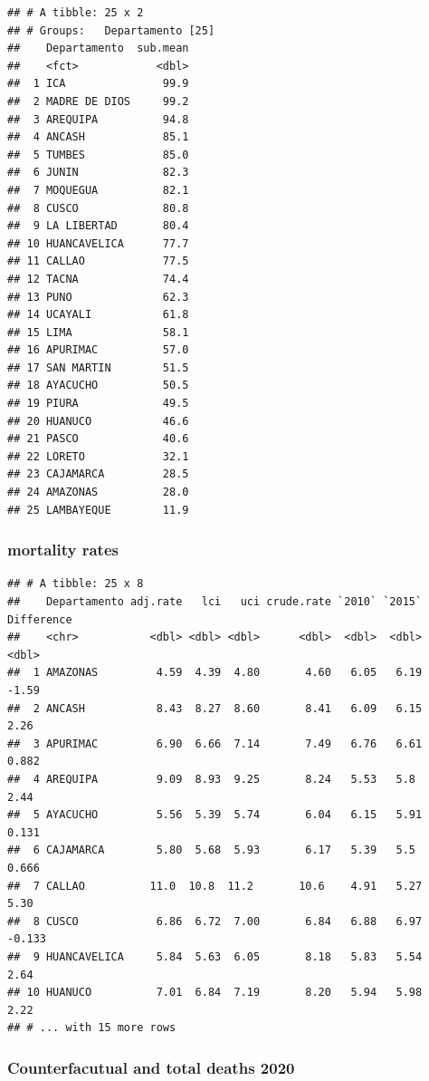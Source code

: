 \documentclass[
]{article}
\begin{document}
\begin{verbatim}
## # A tibble: 25 x 2
## # Groups:   Departamento [25]
##    Departamento  sub.mean
##    <fct>            <dbl>
##  1 ICA               99.9
##  2 MADRE DE DIOS     99.2
##  3 AREQUIPA          94.8
##  4 ANCASH            85.1
##  5 TUMBES            85.0
##  6 JUNIN             82.3
##  7 MOQUEGUA          82.1
##  8 CUSCO             80.8
##  9 LA LIBERTAD       80.4
## 10 HUANCAVELICA      77.7
## 11 CALLAO            77.5
## 12 TACNA             74.4
## 13 PUNO              62.3
## 14 UCAYALI           61.8
## 15 LIMA              58.1
## 16 APURIMAC          57.0
## 17 SAN MARTIN        51.5
## 18 AYACUCHO          50.5
## 19 PIURA             49.5
## 20 HUANUCO           46.6
## 21 PASCO             40.6
## 22 LORETO            32.1
## 23 CAJAMARCA         28.5
## 24 AMAZONAS          28.0
## 25 LAMBAYEQUE        11.9
\end{verbatim}

\hypertarget{mortality-rates}{%
\subsubsection{mortality rates}\label{mortality-rates}}

\begin{verbatim}
## # A tibble: 25 x 8
##    Departamento adj.rate   lci   uci crude.rate `2010` `2015` Difference
##    <chr>           <dbl> <dbl> <dbl>      <dbl>  <dbl>  <dbl>      <dbl>
##  1 AMAZONAS         4.59  4.39  4.80       4.60   6.05   6.19     -1.59 
##  2 ANCASH           8.43  8.27  8.60       8.41   6.09   6.15      2.26 
##  3 APURIMAC         6.90  6.66  7.14       7.49   6.76   6.61      0.882
##  4 AREQUIPA         9.09  8.93  9.25       8.24   5.53   5.8       2.44 
##  5 AYACUCHO         5.56  5.39  5.74       6.04   6.15   5.91      0.131
##  6 CAJAMARCA        5.80  5.68  5.93       6.17   5.39   5.5       0.666
##  7 CALLAO          11.0  10.8  11.2       10.6    4.91   5.27      5.30 
##  8 CUSCO            6.86  6.72  7.00       6.84   6.88   6.97     -0.133
##  9 HUANCAVELICA     5.84  5.63  6.05       8.18   5.83   5.54      2.64 
## 10 HUANUCO          7.01  6.84  7.19       8.20   5.94   5.98      2.22 
## # ... with 15 more rows
\end{verbatim}

\hypertarget{counterfacutual-and-total-deaths-2020}{%
\subsubsection{Counterfacutual and total deaths 2020}\label{counterfacutual-and-total-deaths-2020}}
\end{document}
